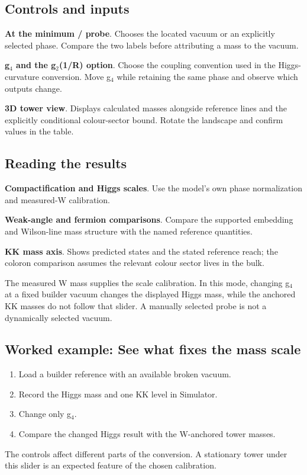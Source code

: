 \documentclass[11pt,a4paper]{article}
\begin{document}
\subsection*{Controls and inputs}
\textbf{At the minimum / probe}. Chooses the located vacuum or an explicitly selected phase. Compare the two labels before attributing a mass to the vacuum.

\textbf{g\ensuremath{{}_{4}} and the g\ensuremath{{}_{2}}(1/R) option}. Choose the coupling convention used in the Higgs-curvature conversion. Move g\ensuremath{{}_{4}} while retaining the same phase and observe which outputs change.

\textbf{3D tower view}. Displays calculated masses alongside reference lines and the explicitly conditional colour-sector bound. Rotate the landscape and confirm values in the table.

\subsection*{Reading the results}
\textbf{Compactification and Higgs scales}. Use the model's own phase normalization and measured-W calibration.

\textbf{Weak-angle and fermion comparisons}. Compare the supported embedding and Wilson-line mass structure with the named reference quantities.

\textbf{KK mass axis}. Shows predicted states and the stated reference reach; the coloron comparison assumes the relevant colour sector lives in the bulk.

The measured W mass supplies the scale calibration. In this mode, changing g\ensuremath{{}_{4}} at a fixed builder vacuum changes the displayed Higgs mass, while the anchored KK masses do not follow that slider. A manually selected probe is not a dynamically selected vacuum.
\subsection*{Worked example: See what fixes the mass scale}
\begin{enumerate}
\item Load a builder reference with an available broken vacuum.
\item Record the Higgs mass and one KK level in Simulator.
\item Change only g\ensuremath{{}_{4}}.
\item Compare the changed Higgs result with the W-anchored tower masses.
\end{enumerate}
The controls affect different parts of the conversion. A stationary tower under this slider is an expected feature of the chosen calibration.
\end{document}

